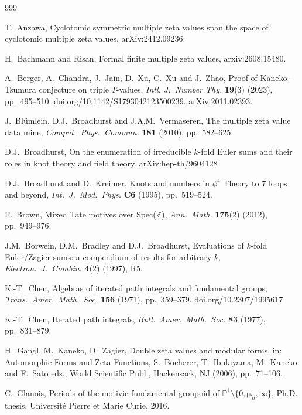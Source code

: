\documentclass{article}
\newcommand{\Z}{\mathbb{Z}}
\theoremstyle{plain}
\theoremstyle{definition}
\begin{document}
\begin{thebibliography}{999}

T.\ Anzawa, Cyclotomic symmetric multiple zeta values span the space of cyclotomic multiple zeta values, arXiv:2412.09236.

H.\ Bachmann and Risan, Formal finite multiple zeta values, arxiv:2608.15480.

A.\ Berger, A.\ Chandra, J.\ Jain, D.\ Xu, C.\ Xu and J.\ Zhao,
Proof of Kaneko--Tsumura conjecture on triple $T$-values, \emph{Intl. J.\ Number Thy.} \textbf{19}(3) (2023), pp.\ 495--510.
doi.org/10.1142/S1793042123500239. arXiv:2011.02393.

J.\ Bl\"umlein, D.J.\ Broadhurst and J.A.M.\ Vermaseren,
The multiple zeta value data mine,
\emph{Comput.\ Phys.\ Commun.} \textbf{181} (2010), pp.\ 582--625.

D.J.\ Broadhurst,
On the enumeration of irreducible $k$-fold Euler sums and their roles in
knot theory and field theory. arXiv:hep-th/9604128

D.J.\ Broadhurst and D.\ Kreimer, Knots and numbers in $\phi^4$ Theory to 7 loops and beyond,
\emph{Int.\ J.\ Mod.\ Phys.} \textbf{C6} (1995), pp.\ 519--524.

F.\ Brown, Mixed Tate motives over Spec($\Z$),
\emph{Ann.\ Math.} \textbf{175}(2) (2012), pp.\ 949--976.

J.M.\ Borwein, D.M.\ Bradley and D.J.\ Broadhurst,
Evaluations of $k$-fold Euler/Zagier sums: a compendium of results for arbitrary $k$,
\emph{Electron.\ J.\ Combin.} \textbf{4}(2) (1997), R5.

K.-T.\ Chen, Algebras of iterated path integrals and fundamental groups,
\emph{Trans.\ Amer.\ Math.\ Soc.} \textbf{156} (1971), pp.\ 359--379. doi.org/10.2307/1995617

K.-T.\ Chen, Iterated path integrals,
\emph{Bull.\ Amer.\ Math.\ Soc.} \textbf{83} (1977), pp.\ 831--879.

H.\ Gangl, M.\ Kaneko, D.\ Zagier, Double zeta values and modular forms,
in: Automorphic Forms and Zeta Functions, S.\ B\"ocherer, T.\ Ibukiyama, M.\ Kaneko and F.\ Sato eds.,
World Scientific Publ., Hackensack, NJ (2006), pp.\ 71--106.

C.\ Glanois, Periods of the motivic fundamental groupoid of ${\mathbb P}^1\setminus\{0,\boldsymbol{\mu}_n,\infty\}$,
Ph.D. thesis, Universit\'e Pierre et Marie Curie, 2016.


\end{thebibliography}
\end{document}
